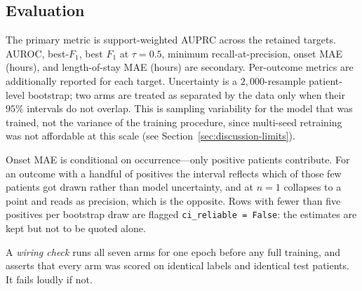 \subsection{Evaluation}
\label{sec:methods-eval}

The primary metric is support-weighted AUPRC across the retained
targets. AUROC, best-$F_1$, best $F_1$ at $\tau{=}0.5$, minimum
recall-at-precision, onset MAE (hours), and length-of-stay MAE (hours)
are secondary. Per-outcome metrics are additionally reported for each
target. Uncertainty is a $2{,}000$-resample patient-level bootstrap; two
arms are treated as separated by the data only when their $95\%$
intervals do not overlap. This is sampling variability for the model
that was trained, not the variance of the training procedure, since
multi-seed retraining was not affordable at this scale (see
Section~\ref{sec:discussion-limits}).

Onset MAE is conditional on occurrence---only positive patients
contribute. For an outcome with a handful of positives the interval
reflects which of those few patients got drawn rather than model
uncertainty, and at $n = 1$ collapses to a point and reads as
precision, which is the opposite. Rows with fewer than five positives
per bootstrap draw are flagged \texttt{ci\_reliable = False}: the
estimates are kept but not to be quoted alone.

A \emph{wiring check} runs all seven arms for one epoch before any full
training, and asserts that every arm was scored on identical labels and
identical test patients. It fails loudly if not.
